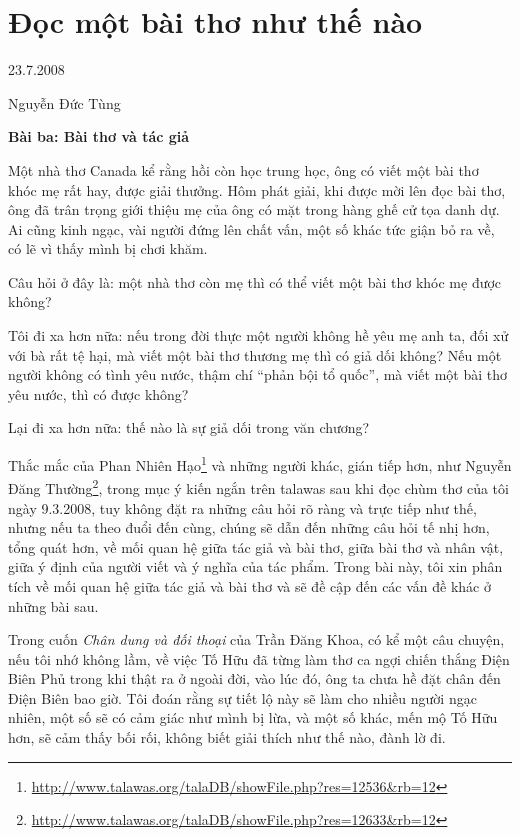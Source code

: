 \documentclass[../main.tex]{subfiles}
\begin{document}
\chapter{Ðọc một bài thơ như thế nào}

\begin{metadata}

\begin{flushright}23.7.2008\end{flushright}

Nguyễn Đức Tùng



\end{metadata}

\begin{multicols}{2}

\textbf{Bài ba: Bài thơ và tác giả }

Một nhà thơ Canada kể rằng hồi còn học trung học, ông có viết một bài thơ khóc mẹ rất hay, được giải thưởng. Hôm phát giải, khi được mời lên đọc bài thơ, ông đã trân trọng giới thiệu mẹ của ông có mặt trong hàng ghế cử tọa danh dự. Ai cũng kinh ngạc, vài người đứng lên chất vấn, một số khác tức giận bỏ ra về, có lẽ vì thấy mình bị chơi khăm. 

Câu hỏi ở đây là: một nhà thơ còn mẹ thì có thể viết một bài thơ khóc mẹ được không? 

Tôi đi xa hơn nữa: nếu trong đời thực một người không hề yêu mẹ anh ta, đối xử với bà rất tệ hại, mà viết một bài thơ thương mẹ thì có giả dối không? Nếu một người không có tình yêu nước, thậm chí “phản bội tổ quốc”, mà viết một bài thơ yêu nước, thì có được không? 

Lại đi xa hơn nữa: thế nào là sự giả dối trong văn chương? 

Thắc mắc của Phan Nhiên Hạo\footnote{\url{http://www.talawas.org/talaDB/showFile.php?res=12536&rb=12}} và những người khác, gián tiếp hơn, như Nguyễn Đăng Thường\footnote{\url{http://www.talawas.org/talaDB/showFile.php?res=12633&rb=12}}, trong mục ý kiến ngắn trên talawas sau khi đọc chùm thơ của tôi ngày 9.3.2008, tuy không đặt ra những câu hỏi rõ ràng và trực tiếp như thế, nhưng nếu ta theo đuổi đến cùng, chúng sẽ dẫn đến những câu hỏi tế nhị hơn, tổng quát hơn, về mối quan hệ giữa tác giả và bài thơ, giữa bài thơ và nhân vật, giữa ý định của người viết và ý nghĩa của tác phẩm. Trong bài này, tôi xin phân tích về mối quan hệ giữa tác giả và bài thơ và sẽ đề cập đến các vấn đề khác ở những bài sau. 

Trong cuốn \textit{Chân dung và đối thoại} của Trần Đăng Khoa, có kể một câu chuyện, nếu tôi nhớ không lầm, về việc Tố Hữu đã từng làm thơ ca ngợi chiến thắng Điện Biên Phủ trong khi thật ra ở ngoài đời, vào lúc đó, ông ta chưa hề đặt chân đến Điện Biên bao giờ. Tôi đoán rằng sự tiết lộ này sẽ làm cho nhiều người ngạc nhiên, một số sẽ có cảm giác như mình bị lừa, và một số khác, mến mộ Tố Hữu hơn, sẽ cảm thấy bối rối, không biết giải thích như thế nào, đành lờ đi. 
\begin{blockquote}



\end{blockquote}
\end{multicols}
\end{document}
